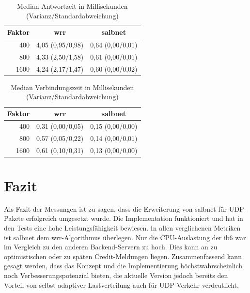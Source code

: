 \documentclass[a4paper, 12pt, BCOR10mm, DIV12, toc=bibliography, toc=listof, german]{scrbook}
\begin{document}
			\begin{table}
				\centering
				\begin{tabular}{|r|c|c|}\hline
					Faktor & wrr & salbnet \\\hline\hline
					400 & 4,05 (0,95/0,98) & 0,64 (0,00/0,01)\\
					800 & 4,33 (2,50/1,58) & 0,61 (0,00/0,01)\\
					1600 & 4,24 (2,17/1,47) & 0,60 (0,00/0,02)\\\hline
				\end{tabular}
				\caption{Median Antwortzeit in Millisekunden (Varianz/Standardabweichung)}
				\label{tab:response}
			\end{table}

			\begin{table}
				\centering
				\begin{tabular}{|r|c|c|}\hline
					Faktor & wrr & salbnet \\\hline\hline
					400 & 0,31 (0,00/0,05) & 0,15 (0,00/0,00)\\
					800 & 0,57 (0,05/0,22) & 0,14 (0,00/0,01)\\
					1600 & 0,61 (0,10/0,31) & 0,13 (0,00/0,00)\\\hline
				\end{tabular}
				\caption{Median Verbindungszeit in Millisekunden (Varianz/Standardabweichung)}
				\label{tab:connect}
			\end{table}


		\section{Fazit} %
		\label{sec:Fazit}

		Als Fazit der Messungen ist zu sagen, dass die Erweiterung von salbnet für UDP-Pakete
		erfolgreich umgesetzt wurde. Die Implementation funktioniert und hat in den Tests eine hohe
		Leistungsfähigkeit bewiesen. In allen verglichenen Metriken ist salbnet dem wrr-Algorithmus
		überlegen. Nur die CPU-Auslastung der ib6 war im Vergleich zu den anderen Backend-Servern zu
		hoch. Dies kann an zu optimistischen oder zu späten Credit-Meldungen liegen. Zusammenfassend
		kann gesagt werden, dass das Konzept und die Implementierung höchstwahrscheinlich noch
		Verbesserungspotenzial bieten, die aktuelle Version jedoch bereits den Vorteil von
		selbst-adaptiver Lastverteilung auch für UDP-Verkehr verdeutlicht.

\end{document}
